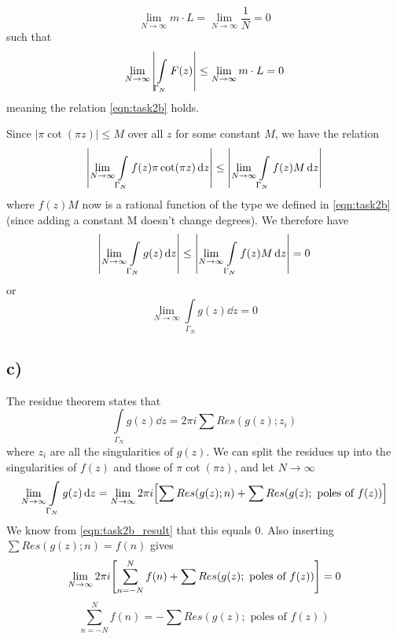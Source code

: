 \documentclass[10pt,a4paper]{article}
\newcommand{\limN}{\lim_{N\rightarrow \infty}}
\newcommand{\Gammaint}{\int\limits_{\Gamma_N}}
\begin{document}
\begin{equation}
    \limN m\cdot L = \limN \frac{1}{N} = 0
\end{equation}
such that
\begin{equation}
    \limN \qty| \Gammaint F(z)| \leq \limN m\cdot L = 0
\end{equation}
meaning the relation \ref{eqn:task2b} holds.

Since $|\pi\cot(\pi z)| \leq M$ over all $z$ for some constant $M$, we have the relation
\begin{equation}
    \qty|\limN \Gammaint f(z) \pi\cot(\pi z) \dd{z}| \leq \qty|\limN \Gammaint f(z) M \dd{z}|
\end{equation}
where $f(z)M$ now is a rational function of the type we defined in \ref{eqn:task2b} (since adding a constant M doesn't change degrees). We therefore have
\begin{equation}
    \qty|\limN \Gammaint g(z)\dd{z}| \leq \qty|\limN \Gammaint f(z) M \dd{z}| = 0
\end{equation}
or
\begin{equation}\label{eqn:task2b_result}
    \limN \Gammaint g(z)\dd{z} = 0
\end{equation}




\subsection*{c)}
The residue theorem states that
\begin{equation}
    \Gammaint g(z) \dd{z} = 2\pi i \sum Res(g(z); z_i)
\end{equation}
where $z_i$ are all the singularities of $g(z)$. We can split the residues up into the singularities of $f(z)$ and those of $\pi \cot(\pi z)$, and let $N\rightarrow \infty$
\begin{equation}
    \limN \Gammaint g(z) \dd{z} = \limN 2\pi i \qty[ \sum Res(g(z); n) + \sum Res(g(z); \text{ poles of } f(z)) ]
\end{equation}
We know from \ref{eqn:task2b_result} that this equals 0. Also inserting $\sum Res(g(z); n) = f(n)$ gives
\begin{equation}
    \limN 2\pi i \qty[\sum_{n=-N}^{N} f(n) + \sum Res(g(z); \text{ poles of } f(z))] = 0
\end{equation}
\begin{equation}\label{eqn:task2c}
    \sum_{n=-N}^{N} f(n) = - \sum Res(g(z); \text{ poles of } f(z))
\end{equation}
\end{document}
